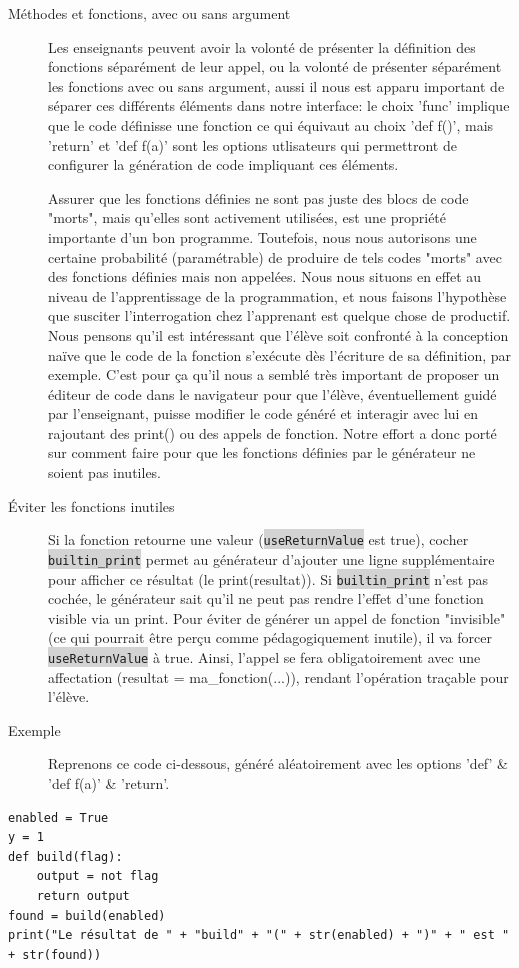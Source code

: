 \documentclass[11pt,a4paper]{article}
\newcommand{\code}[1]{\colorbox{lightgray}{\texttt{\small #1}}}
\begin{document}
\begin{description}
    \item[Méthodes et fonctions, avec ou sans argument] Les enseignants peuvent avoir la volonté de présenter la définition des fonctions séparément de leur appel, ou la volonté de présenter séparément les fonctions avec ou sans argument, aussi il nous est apparu important de séparer ces différents éléments dans notre interface: le choix 'func' implique que le code définisse une fonction ce qui équivaut au choix 'def f()', mais 'return' et 'def f(a)' sont les options utlisateurs qui permettront de configurer la génération de code impliquant ces éléments.\par
    Assurer que les fonctions définies ne sont pas juste des blocs de code "morts", mais qu'elles sont activement utilisées, est une propriété importante d'un bon programme. Toutefois, nous nous autorisons une certaine probabilité (paramétrable) de produire de tels codes "morts" avec des fonctions définies mais non appelées. Nous nous situons en effet au niveau de l'apprentissage de la programmation, et nous faisons l'hypothèse que susciter l'interrogation chez l'apprenant est quelque chose de productif. Nous pensons qu'il est intéressant que l'élève soit confronté à la conception naïve que le code de la fonction s'exécute dès l'écriture de sa définition, par exemple. C'est pour ça qu'il nous a semblé très important de proposer un éditeur de code dans le navigateur pour que l'élève, éventuellement guidé par l'enseignant, puisse modifier le code généré et interagir avec lui en rajoutant des print() ou des appels de fonction. Notre effort a donc porté sur comment faire pour que les fonctions définies par le générateur ne soient pas inutiles.
    
    \item[Éviter les fonctions inutiles] Si la fonction retourne une valeur (\code{useReturnValue} est true), cocher \code{builtin\_print} permet au générateur d'ajouter une ligne supplémentaire pour afficher ce résultat (le print(resultat)). Si \code{builtin\_print} n'est pas cochée, le générateur sait qu'il ne peut pas rendre l'effet d'une fonction visible via un print. Pour éviter de générer un appel de fonction "invisible" (ce qui pourrait être perçu comme pédagogiquement inutile), il va forcer \code{useReturnValue} à true. Ainsi, l'appel se fera obligatoirement avec une affectation (resultat = ma\_fonction(...)), rendant l'opération traçable pour l'élève.
    \item[Exemple] Reprenons ce code ci-dessous, généré aléatoirement avec les options 'def' \& 'def f(a)' \& 'return'.
\end{description}
\begin{verbatim}
enabled = True
y = 1
def build(flag):
    output = not flag
    return output
found = build(enabled)
print("Le résultat de " + "build" + "(" + str(enabled) + ")" + " est " + str(found))
\end{verbatim}
\end{document}
